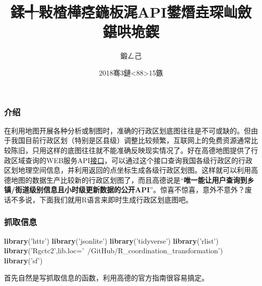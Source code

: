 \documentclass[]{article}
\title{鍒╃敤楂樺痉鍦板浘API鐢熸垚琛屾斂鍖哄垝鍥}
\author{鍛ㄥ己}
\date{2018骞3鏈\textless{}88\textgreater{}15鏃}
\newenvironment{Shaded}{\begin{snugshade}}{\end{snugshade}}
\newcommand{\KeywordTok}[1]{\textcolor[rgb]{0.13,0.29,0.53}{\textbf{#1}}}
\newcommand{\DataTypeTok}[1]{\textcolor[rgb]{0.13,0.29,0.53}{#1}}
\newcommand{\StringTok}[1]{\textcolor[rgb]{0.31,0.60,0.02}{#1}}
\newcommand{\NormalTok}[1]{#1}
\begin{document}
\maketitle

\subsubsection{介绍}

在利用地图开展各种分析或制图时，准确的行政区划底图往往是不可或缺的。但由于我国目前行政区划（特别是区县级）调整比较频繁，互联网上的免费资源通常比较陈旧，只用这样的底图往往就不能准确反映现实情况了。好在高德地图提供了行政区域查询的WEB服务API\href{http://lbs.amap.com/api/webservice/guide/api/district/}{接口}，可以通过这个接口查询我国各级行政区的行政区划地理空间信息，并利用返回的点坐标生成各级行政区划图。这样就可以利用高德地图的数据生产比较新的行政区划图了，而且高德说是``\textbf{唯一能让用户查询到乡镇/街道级别信息且小时级更新数据的公开API}''。惊喜不惊喜，意外不意外？废话不多说，下面我们就用R语言来即时生成行政区划底图吧。

\subsubsection{抓取信息}

\begin{Shaded}
\begin{Highlighting}[]
\KeywordTok{library}\NormalTok{(}\StringTok{'httr'}\NormalTok{)}
\KeywordTok{library}\NormalTok{(}\StringTok{'jsonlite'}\NormalTok{)}
\KeywordTok{library}\NormalTok{(}\StringTok{'tidyverse'}\NormalTok{)}
\KeywordTok{library}\NormalTok{(}\StringTok{'rlist'}\NormalTok{)}
\KeywordTok{library}\NormalTok{(}\StringTok{'Rgctc2'}\NormalTok{,}\DataTypeTok{lib.loc=}\StringTok{'~/GitHub/R_coordination_transformation'}\NormalTok{)}
\KeywordTok{library}\NormalTok{(}\StringTok{'sf'}\NormalTok{)}
\end{Highlighting}
\end{Shaded}

首先自然是写抓取信息的函数，利用高德的官方指南很容易搞定。
\end{document}
